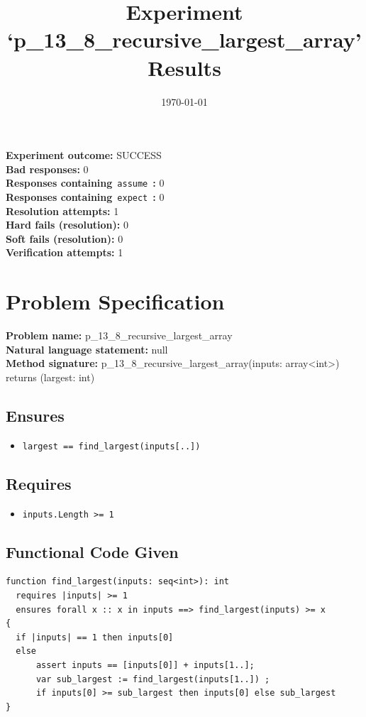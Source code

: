 \documentclass{article}
\begin{document}
\title{Experiment `p\_13\_8\_recursive\_largest\_array' Results}
\author{\today}
\date{}
\maketitle
\textbf{Experiment outcome: }SUCCESS
\\\textbf{Bad responses: }0
\\\textbf{Responses containing}~\texttt{assume}~\textbf{: }0
\\\textbf{Responses containing}~\texttt{expect}~\textbf{: }0
\\\textbf{Resolution attempts: }1
\\\textbf{Hard fails (resolution): }0
\\\textbf{Soft fails (resolution): }0
\\\textbf{Verification attempts: }1
\section*{Problem Specification}
\textbf{Problem name: }p\_13\_8\_recursive\_largest\_array
\\\textbf{Natural language statement: }null
\\\textbf{Method signature: }p\_13\_8\_recursive\_largest\_array(inputs: array<int>) returns (largest: int)
\subsection*{Ensures}
\begin{itemize}
\item \texttt{largest == find\_largest(inputs[..])}
\end{itemize}
\subsection*{Requires}
\begin{itemize}
\item \texttt{inputs.Length >= 1}
\end{itemize}
\subsection*{Functional Code Given}
\begin{lstlisting}
function find_largest(inputs: seq<int>): int
  requires |inputs| >= 1
  ensures forall x :: x in inputs ==> find_largest(inputs) >= x
{
  if |inputs| == 1 then inputs[0]
  else 
      assert inputs == [inputs[0]] + inputs[1..];
      var sub_largest := find_largest(inputs[1..]) ;
      if inputs[0] >= sub_largest then inputs[0] else sub_largest
}
\end{lstlisting}
\clearpage
\end{document}
